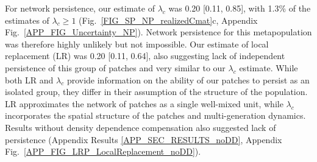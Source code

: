 \documentclass[12pt, oneside]{article}   	%
\begin{document}


For network persistence, our estimate of $\lambda_{c}$ was 0.20 [0.11, 0.85], with 1.3\% of the estimates of $\lambda_c \geq 1$ (Fig.\ \ref{FIG_SP_NP_realizedCmat}c, Appendix Fig.\ \ref{APP_FIG_Uncertainty_NP}). Network persistence for this metapopulation was therefore highly unlikely but not impossible. Our estimate of local replacement (LR) was 0.20 [0.11, 0.64], also suggesting lack of independent persistence of this group of patches and very similar to our $\lambda_{c}$ estimate. While both LR and $\lambda_{c}$ provide information on the ability of our patches to persist as an isolated group, they differ in their assumption of the structure of the population. LR approximates the network of patches as a single well-mixed unit, while $\lambda_{c}$ incorporates the spatial structure of the patches and multi-generation dynamics. Results without density dependence compensation also suggested lack of persistence (Appendix Results \ref{APP_SEC_RESULTS_noDD}, Appendix Fig.\ \ref{APP_FIG_LRP_LocalReplacement_noDD}).
\end{document}
